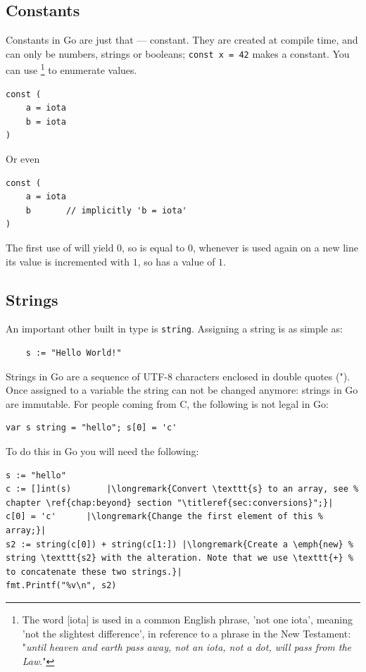 \subsection{Constants}
Constants in Go are just that --- constant. They are created at compile
time, and can only be numbers, strings or booleans;
\lstinline{const x = 42} makes  a constant. You can use
\footnote{The word [iota] is used in a common English phrase,
'not one iota', meaning 'not the slightest difference', in reference to
a phrase in the New Testament: "\emph{until heaven and earth pass away, not an
iota, not a dot, will pass from the Law}."\cite{iota}}
to enumerate values.
\begin{lstlisting}
const (
	a = iota
	b = iota 
)
\end{lstlisting}
Or even
\begin{lstlisting}
const (
	a = iota
	b	    // implicitly 'b = iota'
)
\end{lstlisting}
The first use of  will yield $0$, so  is equal to $0$, whenever
 is used again on a new line its value is incremented with $1$, so 
has a value of $1$.

\subsection{Strings}
An important other built in type is \lstinline{string}. Assigning a
string is as simple as:
\begin{lstlisting}
    s := "Hello World!"
\end{lstlisting}
Strings in Go are a sequence of UTF-8 characters enclosed in double
quotes (").
Once assigned to a variable the string can not be changed anymore: strings in Go are
immutable. For
people coming from C, the following is not legal in Go:
\begin{lstlisting}
var s string = "hello"; s[0] = 'c'
\end{lstlisting}
To do this in Go you will need the following:
\begin{lstlisting}
s := "hello"
c := []int(s)	    |\longremark{Convert \texttt{s} to an array, see %
chapter \ref{chap:beyond} section "\titleref{sec:conversions}";}|
c[0] = 'c'	    |\longremark{Change the first element of this %
array;}|
s2 := string(c[0]) + string(c[1:]) |\longremark{Create a \emph{new} %
string \texttt{s2} with the alteration. Note that we use \texttt{+} %
to concatenate these two strings.}|
fmt.Printf("%v\n", s2)
\end{lstlisting}

